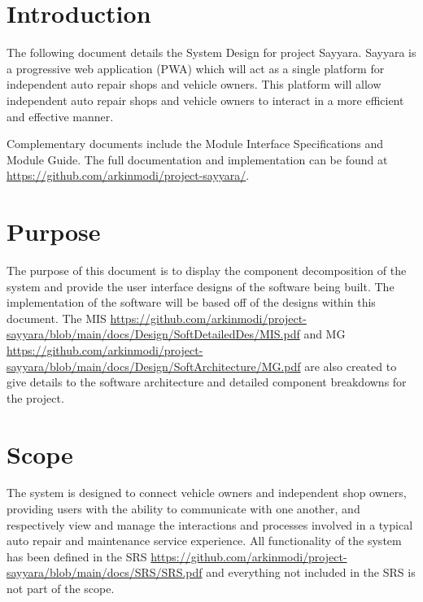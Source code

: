 \documentclass[12pt, titlepage]{article}
\begin{document}
\listoftables

\listoffigures

\newpage


\section{Introduction}

The following document details the System Design for project Sayyara. Sayyara is a progressive web
application (PWA) which will act as a single platform for independent auto repair shops and vehicle
owners. This platform will allow independent auto repair shops and vehicle owners to interact in a
more efficient and effective manner.

Complementary documents include the Module Interface Specifications and Module Guide. The full
documentation and implementation can be found at
\url{https://github.com/arkinmodi/project-sayyara/}.

\section{Purpose}

The purpose of this document is to display the component decomposition of the system and provide
the user interface designs of the software being built. The implementation of the software will be
based off of the designs within this document. The MIS
\url{https://github.com/arkinmodi/project-sayyara/blob/main/docs/Design/SoftDetailedDes/MIS.pdf}
and MG
\url{https://github.com/arkinmodi/project-sayyara/blob/main/docs/Design/SoftArchitecture/MG.pdf}
are also created to give details to the software architecture and detailed component breakdowns for
the project.

\section{Scope}

The system is designed to connect vehicle owners and independent shop owners, providing users with
the ability to communicate with one another, and respectively view and manage the interactions and
processes involved in a typical auto repair and maintenance service experience. All functionality
of the system has been defined in the SRS
\url{https://github.com/arkinmodi/project-sayyara/blob/main/docs/SRS/SRS.pdf} and everything not
included in the SRS is not part of the scope.
\end{document}

